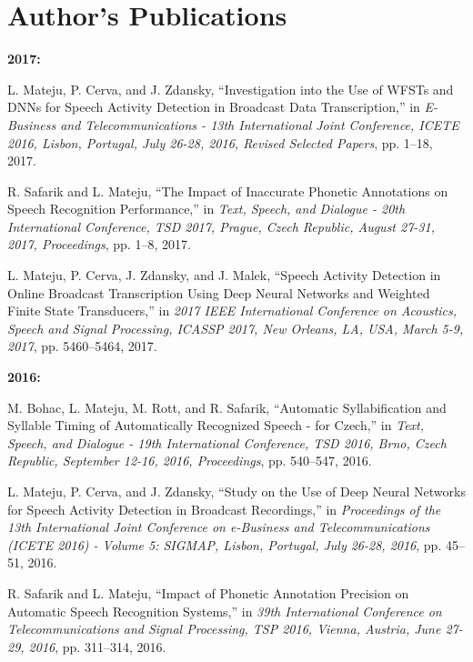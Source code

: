 \documentclass[FM,noheader,EN]{tulthesis}
\begin{document}





\newpage
\chapter*{Author's Publications}
	
	\textbf{2017:}
	\begin{enumerate}[leftmargin=*]
		L. Mateju, P. Cerva, and J. Zdansky, “Investigation into the Use of WFSTs and DNNs for 
		Speech Activity Detection in Broadcast Data Transcription,” in \textit{E-Business and
		Telecommunications - 13th International Joint Conference, ICETE 2016, Lisbon,
		Portugal, July 26-28, 2016, Revised Selected Papers}, pp. 1–18, 2017.
	
		R. Safarik and L. Mateju, “The Impact of Inaccurate Phonetic Annotations 
		on Speech Recognition Performance,” in \textit{Text, Speech, and Dialogue - 20th 
		International Conference, TSD 2017, Prague, Czech Republic, August 27-31, 2017, 
		Proceedings}, pp. 1–8, 2017.
	
		L. Mateju, P. Cerva, J. Zdansky, and J. Malek, “Speech Activity Detection in 
		Online Broadcast Transcription Using Deep Neural Networks and Weighted Finite
		State Transducers,” in \textit{2017 IEEE International Conference on Acoustics, Speech 
		and Signal Processing, ICASSP 2017, New Orleans, LA, USA, March 5-9, 2017}, 
		pp. 5460–5464, 2017.
	\end{enumerate}
	
	\noindent \textbf{2016:}
	\begin{enumerate}[leftmargin=*,resume]
		M. Bohac, L. Mateju, M. Rott, and R. Safarik, “Automatic Syllabification and 
		Syllable Timing of Automatically Recognized Speech - for Czech,” in \textit{Text, Speech, 
		and Dialogue - 19th International Conference, TSD 2016, Brno, Czech Republic, 
		September 12-16, 2016, Proceedings}, pp. 540–547, 2016.
	
		L. Mateju, P. Cerva, and J. Zdansky, “Study on the Use of Deep Neural Networks 
		for Speech Activity Detection in Broadcast Recordings,” in \textit{Proceedings of the 13th 
		International Joint Conference on e-Business and Telecommunications (ICETE 
		2016) - Volume 5: SIGMAP, Lisbon, Portugal, July 26-28, 2016}, pp. 45–51, 
		2016.
		
		R. Safarik and L. Mateju, “Impact of Phonetic Annotation Precision on Automatic 
		Speech Recognition Systems,” in \textit{39th International Conference on 
		Telecommunications and Signal Processing, TSP 2016, Vienna, Austria, June 27-29, 2016}, 
		pp. 311–314, 2016.
	\end{enumerate}
	
\end{document}
